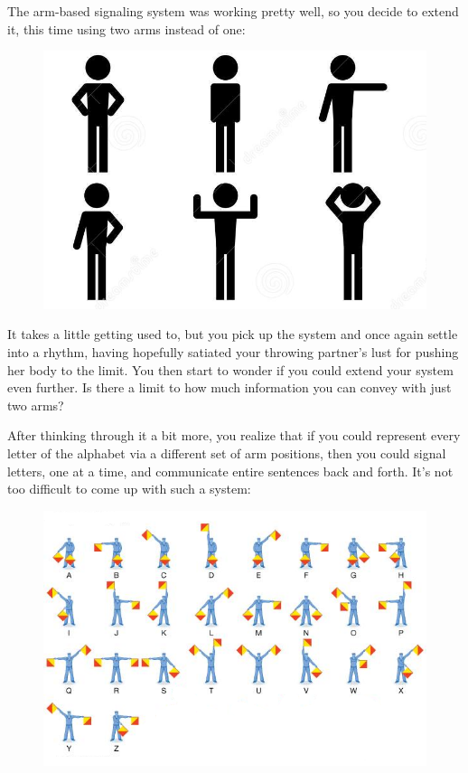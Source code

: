 \documentclass{book}
\begin{document}
The arm-based signaling system was working pretty well, so you decide to extend it, this time using two arms instead of one:

\begin{figure}[H]
\centering
\includegraphics{stick-figure-six-positions-simplified}
\end{figure}

It takes a little getting used to, but you pick up the system and once again settle into a rhythm, having hopefully satiated your throwing partner's lust for pushing her body to the limit. You then start to wonder if you could extend your system even further. Is there a limit to how much information you can convey with just two arms?

After thinking through it a bit more, you realize that if you could represent every letter of the alphabet via a different set of arm positions, then you could signal letters, one at a time, and communicate entire sentences back and forth. It's not too difficult to come up with such a system:

\begin{figure}[H]
\centering
\includegraphics[width=0.9\linewidth]{semaphore_flags}
\end{figure}
\end{document}
